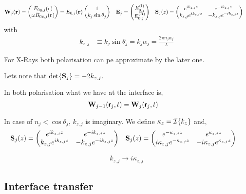 \begin{align*}
	\vb{W}_j\pqty{\vb{r}} & = \pmqty{E_{0y,j}\pqty{\vb{r}}                                 \\ \omega B_{0x,j}\pqty{\vb{r}} } = E_{0,j}\pqty{\vb{r}}\pmqty{1 \\ k_j\sin\theta_j  }
	                      & \vb{E}_j                       & = \pmqty{E_{0,j}^{\text{(I)}} \\ E_{0,j}^{\text{(R)}}}
	                      &
	\vb{S}_j\pqty{z}      & = \pmqty{
	e^{ik_{z,j}z}         &
	e^{-ik_{z,j}z}                                                                         \\
	k_{z,j} e^{ik_{z,j}z} &
	-k_{z,j} e^{-ik_{z,j}z}
	}
\end{align*} with
\begin{align*}
	k_{z,j} & \equiv k_{j}\sin\theta_{j} = k_j\alpha_j = \frac{2\pi n_j\alpha_j}{\lambda}
\end{align*}

For X-Rays both polarisation can pe approximate by the later one.

Lets note that $\det{\vb{S}_j} = -2k_{z,j}$.

In both polarisation what we have at the interface is,
\begin{align*}
	\vb{W}_{j-1}\pqty{\boldsymbol{\mathsf{r}}_j,t} & = \vb{W}_{j}\pqty{\boldsymbol{\mathsf{r}}_j,t}
\end{align*}

In case of $n_j < \cos\theta_j$, $k_{z,j}$ is imaginary. We define $\kappa_z = \mathcal{I}\qty{k_z}$ and,
\begin{align*}
	\vb{S}_j\pqty{z}                 & = \pmqty{
	e^{ik_{z,j}z}                    &
	e^{-ik_{z,j}z}                               \\
	k_{z,j} e^{ik_{z,j}z}            &
	-k_{z,j} e^{-ik_{z,j}z}
	}                                &
	\vb{S}_j\pqty{z}                 & = \pmqty{
	e^{-\kappa_{z,j}z}               &
	e^{\kappa_{z,j}z}                            \\
	i\kappa_{z,j} e^{-\kappa_{z,j}z} &
		-i\kappa_{z,j} e^{\kappa_{z,j}z}
	}
\end{align*}

\begin{align*}
	k_{z,j} \to i\kappa_{z,j}
\end{align*}

\subsection{Interface transfer} %
\label{sub:interface_transfer}


